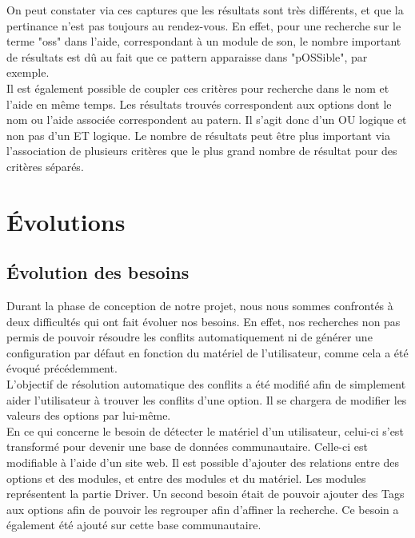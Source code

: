 \documentclass[17pts]{report}
\begin{document}
On peut constater via ces captures que les résultats sont très différents, et 
que la pertinance n'est pas toujours au rendez-vous. En effet, pour une 
recherche sur le terme "oss" dans l'aide, correspondant à un module de son, le
 nombre important de résultats est dû au fait que ce pattern apparaisse dans 
"pOSSible", par exemple.\\

Il est également possible de coupler ces critères pour recherche dans le nom et 
l'aide en même temps. Les résultats trouvés correspondent aux options dont le
nom ou l'aide associée correspondent au patern. Il s'agit donc d'un OU logique
et non pas d'un ET logique. Le nombre de résultats peut être plus important via
l'association de plusieurs critères que le plus grand nombre de résultat pour 
des critères séparés.\\

\section{Évolutions}
\label{sec:Évolutions}
\subsection{Évolution des besoins}
\label{sub:Évolution des besoins}

Durant la phase de conception de notre projet, nous nous sommes confrontés à
deux difficultés qui ont fait évoluer nos besoins. En effet, nos recherches non
pas permis de pouvoir résoudre les conflits automatiquement ni de générer une
configuration par défaut en fonction du matériel de l'utilisateur, comme cela a
été évoqué précédemment.  \\

L'objectif de résolution automatique des conflits a été modifié afin de
simplement aider l'utilisateur à trouver les conflits d'une option. Il se
chargera de modifier les valeurs des options par lui-même.  \\

En ce qui concerne le besoin de détecter le matériel d'un utilisateur, celui-ci
s'est transformé pour devenir une base de données communautaire. Celle-ci est
modifiable à l'aide d'un site web. Il est possible d'ajouter des relations
entre des options et des modules, et entre des modules et du matériel. Les
modules représentent la partie Driver. Un second besoin était de pouvoir
ajouter des Tags aux options afin de pouvoir les regrouper afin d'affiner la
recherche. Ce besoin a également été ajouté sur cette base communautaire.
\end{document}
